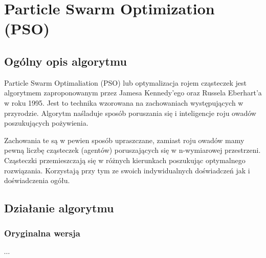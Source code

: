 
\section{Particle Swarm Optimization (PSO)}
\author{Paweł Jastrzębski}
\subsection{Ogólny opis algorytmu}
\par Particle Swarm Optimaliation (PSO) lub optymalizacja rojem cząsteczek jest algorytmem zaproponowanym przez Jamesa Kennedy'ego oraz Russela Eberhart'a w roku 1995. Jest to technika wzorowana na zachowaniach występujących w przyrodzie. Algorytm naśladuje sposób poruszania się i inteligencje roju owadów poszukujących pożywienia. 
\par Zachowania te są w pewien sposób upraszczane, zamiast roju owadów mamy pewną liczbę cząsteczek (agentów) poruszających się w n-wymiarowej przestrzeni. Cząsteczki przemieszczają się w różnych kierunkach poszukując optymalnego rozwiązania. Korzystają przy tym ze swoich indywidualnych doświadczeń jak i doświadczenia ogółu.
\subsection{Działanie algorytmu}
\subsubsection{Oryginalna wersja}
$\cdots$
